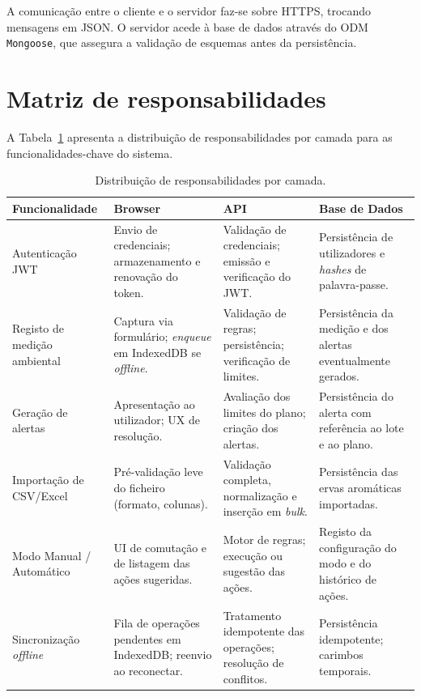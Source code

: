 A comunicação entre o cliente e o servidor faz-se sobre HTTPS,
trocando mensagens em JSON. O servidor acede à base de dados
através do ODM \texttt{Mongoose}, que assegura a validação de
esquemas antes da persistência.


\section{Matriz de responsabilidades}
\label{sec:matriz-responsabilidades}


A Tabela~\ref{tab:matriz} apresenta a distribuição de
responsabilidades por camada para as funcionalidades-chave do
sistema.

\begin{table}[H]
\centering
\caption{Distribuição de responsabilidades por camada.}
\label{tab:matriz}
\footnotesize
\renewcommand{\arraystretch}{1.4}
\begin{tabularx}{\linewidth}{l X X X}
\toprule
\textbf{Funcionalidade} & \textbf{Browser} & \textbf{API} & \textbf{Base de Dados} \\
\midrule
Autenticação JWT &
Envio de credenciais; armazenamento e renovação do token. &
Validação de credenciais; emissão e verificação do JWT. &
Persistência de utilizadores e \emph{hashes} de palavra-passe. \\

Registo de medição ambiental &
Captura via formulário; \emph{enqueue} em IndexedDB se \emph{offline}. &
Validação de regras; persistência; verificação de limites. &
Persistência da medição e dos alertas eventualmente gerados. \\

Geração de alertas &
Apresentação ao utilizador; UX de resolução. &
Avaliação dos limites do plano; criação dos alertas. &
Persistência do alerta com referência ao lote e ao plano. \\

Importação de CSV/Excel &
Pré-validação leve do ficheiro (formato, colunas). &
Validação completa, normalização e inserção em \emph{bulk}. &
Persistência das ervas aromáticas importadas. \\

Modo Manual / Automático &
UI de comutação e de listagem das ações sugeridas. &
Motor de regras; execução ou sugestão das ações. &
Registo da configuração do modo e do histórico de ações. \\

Sincronização \emph{offline} &
Fila de operações pendentes em IndexedDB; reenvio ao reconectar. &
Tratamento idempotente das operações; resolução de conflitos. &
Persistência idempotente; carimbos temporais. \\
\bottomrule
\end{tabularx}
\end{table}


